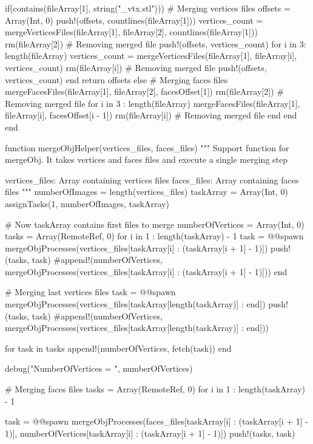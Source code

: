 \documentclass[11pt,oneside]{article}	%
\begin{document}
{  if(contains(fileArray[1], string("_vtx.stl")))
    # Merging vertices files
    offsets = Array(Int, 0)
    push!(offsets, countlines(fileArray[1]))
    vertices_count = mergeVerticesFiles(fileArray[1], fileArray[2], countlines(fileArray[1]))
    rm(fileArray[2]) # Removing merged file
    push!(offsets, vertices_count)
    for i in 3: length(fileArray)
      vertices_count = mergeVerticesFiles(fileArray[1], fileArray[i], vertices_count)
      rm(fileArray[i]) # Removing merged file
      push!(offsets, vertices_count)
    end
    return offsets
  else
    # Merging faces files
    mergeFacesFiles(fileArray[1], fileArray[2], facesOffset[1])
    rm(fileArray[2]) # Removing merged file
    for i in 3 : length(fileArray)
      mergeFacesFiles(fileArray[1], fileArray[i], facesOffset[i - 1])
      rm(fileArray[i]) # Removing merged file
    end
  end
end

function mergeObjHelper(vertices_files, faces_files)
  """
  Support function for mergeObj. It takes vertices and faces files
  and execute a single merging step
  
  vertices_files: Array containing vertices files
  faces_files: Array containing faces files
  """
  numberOfImages = length(vertices_files)
  taskArray = Array(Int, 0)
  assignTasks(1, numberOfImages, taskArray)
  
  # Now taskArray contains first files to merge
  numberOfVertices = Array(Int, 0)
  tasks = Array(RemoteRef, 0)
  for i in 1 : length(taskArray) - 1
    task = @@spawn mergeObjProcesses(vertices_files[taskArray[i] : (taskArray[i + 1] - 1)])
    push!(tasks, task)
    #append!(numberOfVertices, mergeObjProcesses(vertices_files[taskArray[i] : (taskArray[i + 1] - 1)]))
  end
  
  # Merging last vertices files
  task = @@spawn mergeObjProcesses(vertices_files[taskArray[length(taskArray)] : end])
  push!(tasks, task)
  #append!(numberOfVertices, mergeObjProcesses(vertices_files[taskArray[length(taskArray)] : end]))
  
  
  for task in tasks
    append!(numberOfVertices, fetch(task))
  end
  
  debug("NumberOfVertices = ", numberOfVertices)

  # Merging faces files
  tasks = Array(RemoteRef, 0)
  for i in 1 : length(taskArray) - 1
    
    task = @@spawn mergeObjProcesses(faces_files[taskArray[i] : (taskArray[i + 1] - 1)],
                                    numberOfVertices[taskArray[i] : (taskArray[i + 1] - 1)])
    push!(tasks, task)
    
}
\end{document}
